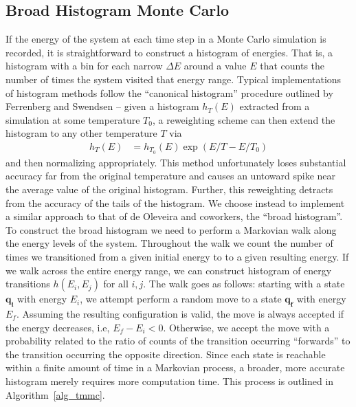 \documentclass[12pt]{article}
\begin{document}
\subsection{Broad Histogram Monte Carlo}
If the energy of the system at each time step in a Monte Carlo simulation is recorded, it is straightforward to construct a histogram of energies. That is, a histogram with a bin for each narrow $\Delta E$ around a value $E$ that counts the number of times the system visited that energy range. Typical implementations of histogram methods follow the ``canonical histogram'' procedure outlined by Ferrenberg and Swendsen \cite{ferrenberg1988histogram} -- given a histogram $h_T(E)$ extracted from a simulation at some temperature $T_0$, a reweighting scheme can then extend the histogram to any other temperature $T$ via 
\begin{align}
    h_{T}(E) &= h_{T_0}(E) \exp\left(E/T - E/T_0 \right)
\end{align}
and then normalizing appropriately. This method unfortunately loses substantial accuracy far from the original temperature and causes an untoward spike near the average value of the original histogram. Further, this reweighting detracts from the accuracy of the tails of the histogram. We choose instead to implement a similar approach to that of de Oleveira and coworkers\cite{de1998broad}, the ``broad histogram''. \\

To construct the broad histogram we need to perform a Markovian walk along the energy levels of the system. Throughout the walk we count the number of times we transitioned from a given initial energy to to a given resulting energy. If we walk across the entire energy range, we can construct histogram of energy transitions $h(E_i, E_j)$ for all $i, j$. The walk goes as follows: starting with a state $\mathbf{q_i}$ with energy $E_i$, we attempt perform a random move to a state $\mathbf{q_f}$ with energy $E_f$. Assuming the resulting configuration is valid, the move is always accepted if the energy decreases, i.e, $E_f - E_i <0$. Otherwise, we accept the move with a probability related to the ratio of counts of the transition occurring ``forwards'' to the transition occurring the opposite direction. Since each state is reachable within a finite amount of time in a Markovian process, a broader, more accurate histogram merely requires more computation time. This process is outlined in Algorithm~\ref{alg_tmmc}.\\
\end{document}
